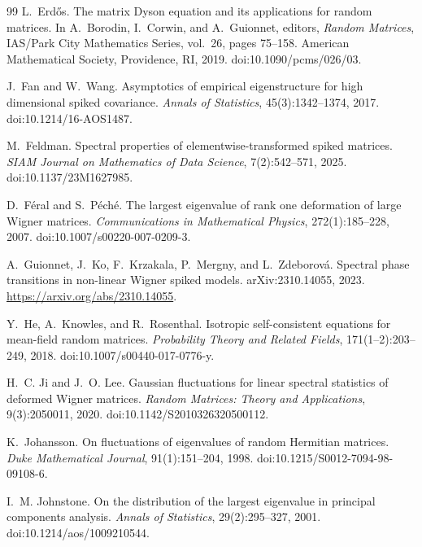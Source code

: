 \documentclass[11pt]{article}
\theoremstyle{definition}
\theoremstyle{remark}
\begin{document}
\begin{thebibliography}{99}
L.~Erd\H{o}s.
\newblock The matrix Dyson equation and its applications for random matrices.
\newblock In A.~Borodin, I.~Corwin, and A.~Guionnet, editors,
\emph{Random Matrices}, IAS/Park City Mathematics Series, vol.~26,
pages 75--158. American Mathematical Society, Providence, RI, 2019.
\newblock doi:10.1090/pcms/026/03.

J.~Fan and W.~Wang.
\newblock Asymptotics of empirical eigenstructure for high dimensional spiked covariance.
\newblock \emph{Annals of Statistics}, 45(3):1342--1374, 2017.
\newblock doi:10.1214/16-AOS1487.

M.~Feldman.
\newblock Spectral properties of elementwise-transformed spiked matrices.
\newblock \emph{SIAM Journal on Mathematics of Data Science}, 7(2):542--571, 2025.
\newblock doi:10.1137/23M1627985.

D.~F\'{e}ral and S.~P\'{e}ch\'{e}.
\newblock The largest eigenvalue of rank one deformation of large Wigner matrices.
\newblock \emph{Communications in Mathematical Physics}, 272(1):185--228, 2007.
\newblock doi:10.1007/s00220-007-0209-3.

A.~Guionnet, J.~Ko, F.~Krzakala, P.~Mergny, and L.~Zdeborov\'{a}.
\newblock Spectral phase transitions in non-linear Wigner spiked models.
\newblock arXiv:2310.14055, 2023.
\newblock \url{https://arxiv.org/abs/2310.14055}.

Y.~He, A.~Knowles, and R.~Rosenthal.
\newblock Isotropic self-consistent equations for mean-field random matrices.
\newblock \emph{Probability Theory and Related Fields}, 171(1--2):203--249,
2018.
\newblock doi:10.1007/s00440-017-0776-y.

H.~C. Ji and J.~O. Lee.
\newblock Gaussian fluctuations for linear spectral statistics of deformed
Wigner matrices.
\newblock \emph{Random Matrices: Theory and Applications}, 9(3):2050011, 2020.
\newblock doi:10.1142/S2010326320500112.

K.~Johansson.
\newblock On fluctuations of eigenvalues of random Hermitian matrices.
\newblock \emph{Duke Mathematical Journal}, 91(1):151--204, 1998.
\newblock doi:10.1215/S0012-7094-98-09108-6.

I.~M. Johnstone.
\newblock On the distribution of the largest eigenvalue in principal components analysis.
\newblock \emph{Annals of Statistics}, 29(2):295--327, 2001.
\newblock doi:10.1214/aos/1009210544.


\end{thebibliography}
\end{document}
